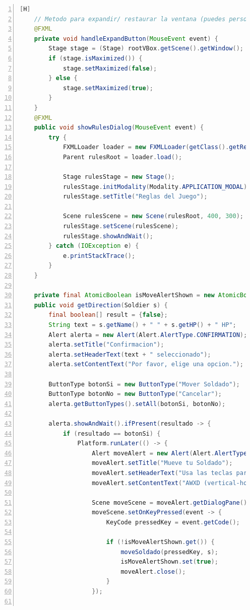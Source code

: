 \documentclass{article}
\begin{document}
\begin{lstlisting}[language=java,caption={Clase controladora}, numbers=left][H]
    // Metodo para expandir/ restaurar la ventana (puedes personalizar segun tus necesidades)
    @FXML
    private void handleExpandButton(MouseEvent event) {
        Stage stage = (Stage) rootVBox.getScene().getWindow();
        if (stage.isMaximized()) {
            stage.setMaximized(false);
        } else {
            stage.setMaximized(true);
        }
    }
    @FXML
    public void showRulesDialog(MouseEvent event) {
        try {
            FXMLLoader loader = new FXMLLoader(getClass().getResource("Rules.fxml"));
            Parent rulesRoot = loader.load();

            Stage rulesStage = new Stage();
            rulesStage.initModality(Modality.APPLICATION_MODAL);
            rulesStage.setTitle("Reglas del Juego");

            Scene rulesScene = new Scene(rulesRoot, 400, 300);
            rulesStage.setScene(rulesScene);
            rulesStage.showAndWait();
        } catch (IOException e) {
            e.printStackTrace();
        }
    }

    private final AtomicBoolean isMoveAlertShown = new AtomicBoolean(false);
    public void getDirection(Soldier s) {
        final boolean[] result = {false};
        String text = s.getName() + " " + s.getHP() + " HP";
        Alert alerta = new Alert(Alert.AlertType.CONFIRMATION);
        alerta.setTitle("Confirmacion");
        alerta.setHeaderText(text + " seleccionado");
        alerta.setContentText("Por favor, elige una opcion.");

        ButtonType botonSi = new ButtonType("Mover Soldado");
        ButtonType botonNo = new ButtonType("Cancelar");
        alerta.getButtonTypes().setAll(botonSi, botonNo);

        alerta.showAndWait().ifPresent(resultado -> {
            if (resultado == botonSi) {
                Platform.runLater(() -> {
                    Alert moveAlert = new Alert(Alert.AlertType.INFORMATION);
                    moveAlert.setTitle("Mueve tu Soldado");
                    moveAlert.setHeaderText("Usa las teclas para mover tu soldado.");
                    moveAlert.setContentText("AWXD (vertical-horizontal), QEZC (diagonal) o S (no moverse)");

                    Scene moveScene = moveAlert.getDialogPane().getScene();
                    moveScene.setOnKeyPressed(event -> {
                        KeyCode pressedKey = event.getCode();

                        if (!isMoveAlertShown.get()) {
                            moveSoldado(pressedKey, s);
                            isMoveAlertShown.set(true);
                            moveAlert.close();
                        }
                    });


\end{lstlisting}
\end{document}
